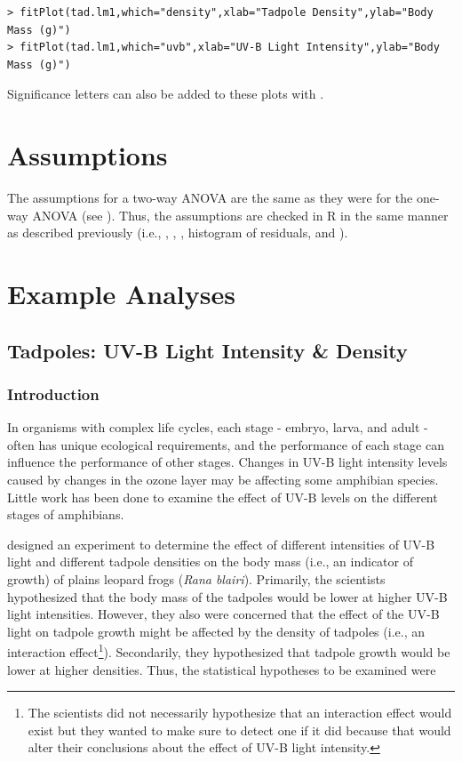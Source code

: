 \documentclass[10pt,openany]{book}\usepackage[]{graphicx}\usepackage[]{color}
\makeatletter
\newenvironment{kframe}{%
 \def\at@end@of@kframe{}%
 \ifinner\ifhmode%
  \def\at@end@of@kframe{\end{minipage}}%
  \begin{minipage}{\columnwidth}%
 \fi\fi%
 \def\FrameCommand##1{\hskip\@totalleftmargin \hskip-\fboxsep
 \colorbox{shadecolor}{##1}\hskip-\fboxsep
     \hskip-\linewidth \hskip-\@totalleftmargin \hskip\columnwidth}%
 \MakeFramed {\advance\hsize-\width
   \@totalleftmargin\z@ \linewidth\hsize
   \@setminipage}}%
 {\par\unskip\endMakeFramed%
 \at@end@of@kframe}
\newenvironment{knitrout}{}{} %
\makeatother
\begin{document}
\begin{knitrout}
\color{fgcolor}\begin{kframe}
\begin{verbatim}
> fitPlot(tad.lm1,which="density",xlab="Tadpole Density",ylab="Body Mass (g)")
> fitPlot(tad.lm1,which="uvb",xlab="UV-B Light Intensity",ylab="Body Mass (g)")
\end{verbatim}
\end{kframe}
\end{knitrout}

Significance letters can also be added to these plots with .


\section{Assumptions}
The assumptions for a two-way ANOVA are the same as they were for the one-way ANOVA (see ). Thus, the assumptions are checked in R in the same manner as described previously (i.e., , , , histogram of residuals, and ).


\section{Example Analyses} \label{sec:ANOVA2Examples}
\subsection{Tadpoles: UV-B Light Intensity \& Density}
\subsubsection*{Introduction}
In organisms with complex life cycles, each stage - embryo, larva, and adult - often has unique ecological requirements, and the performance of each stage can influence the performance of other stages.  Changes in UV-B light intensity levels caused by changes in the ozone layer may be affecting some amphibian species.  Little work has been done to examine the effect of UV-B levels on the different stages of amphibians.

\cite{Smithetal2000} designed an experiment to determine the effect of different intensities of UV-B light and different tadpole densities on the body mass (i.e., an indicator of growth) of plains leopard frogs (\emph{Rana blairi}).  Primarily, the scientists hypothesized that the body mass of the tadpoles would be lower at higher UV-B light intensities.  However, they also were concerned that the effect of the UV-B light on tadpole growth might be affected by the density of tadpoles (i.e., an interaction effect\footnote{The scientists did not necessarily hypothesize that an interaction effect would exist but they wanted to make sure to detect one if it did because that would alter their conclusions about the effect of UV-B light intensity.}).  Secondarily, they hypothesized that tadpole growth would be lower at higher densities.  Thus, the statistical hypotheses to be examined were
\end{document}
